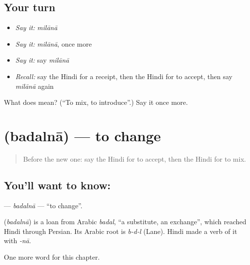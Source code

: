 \subsection*{Your turn}
\begin{itemize}
\raggedright
  \item \emph{Say it:} \emph{milānā}
  \item \emph{Say it:} \emph{milānā}, once more
  \item \emph{Say it:} say \emph{milānā}
  \item \emph{Recall:} say the Hindi for a receipt, then the Hindi for to accept, then say \emph{milānā} again
\end{itemize}

\begin{tcolorbox}[breakable,colback=teal!4,colframe=teal!35!black,title={Before you move on}]
What does  mean? (\textquotedblleft{}To mix, to introduce\textquotedblright{}.) Say it once more.
\end{tcolorbox}
\section[\texorpdfstring{\hi{बदलना} (badalnā)}{बदलना (badalnā)}]{ (badalnā) — to change}

\label{lesson:HI-C168-badalna}



\begin{quote}
Before the new one: say the Hindi for to accept, then the Hindi for to mix.
\end{quote}

\subsection*{You'll want to know: }
\textbf{} — \emph{badalnā} — \textquotedblleft{}to change\textquotedblright{}.

\begin{cousinweb}
\textbf{} (\emph{badalnā}) is a loan from Arabic \emph{badal}, \textquotedblleft{}a substitute, an exchange\textquotedblright{}, which reached Hindi through Persian. Its Arabic root is \emph{b-d-l} (Lane). Hindi made a verb of it with \emph{-nā}.
\end{cousinweb}

\begin{grammarlens}[title={What you've built}]
One more word for this chapter.
\end{grammarlens}

